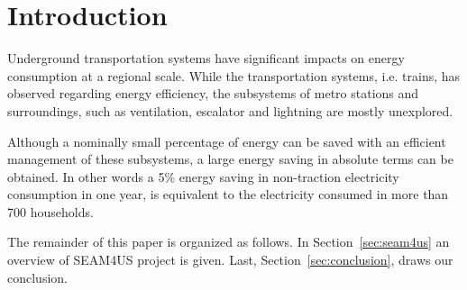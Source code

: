\section{Introduction}
\label{sec:introduction}

Underground transportation systems have significant impacts on energy consumption at a regional scale. While the transportation systems, i.e. trains, has observed regarding energy efficiency, the subsystems of metro stations and surroundings, such as ventilation, escalator and lightning are mostly unexplored.

Although a nominally small percentage of energy can be saved with an efficient management of these subsystems, a large energy saving in absolute terms can be obtained. In other words a 5\% energy saving in non-traction electricity consumption in one year, is equivalent to the electricity consumed in more than 700 households. 

The remainder of this paper is organized as follows. In Section~\ref{sec:seam4us} an overview of SEAM4US project is given. Last, Section~\ref{sec:conclusion}, draws our conclusion.


